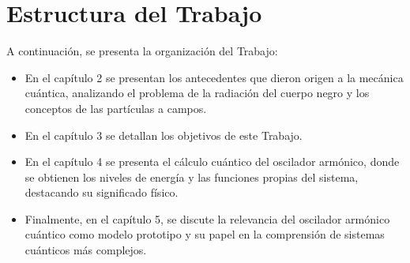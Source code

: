 
\section{Estructura del Trabajo}
	


A continuación, se presenta la organización del Trabajo:

\begin{itemize}
    \item En el capítulo 2 se presentan los antecedentes que dieron origen a la mecánica cuántica, analizando el problema de la radiación del cuerpo negro y los conceptos de las partículas a campos.
    \item En el capítulo 3 se detallan los objetivos de este Trabajo.
    \item En el capítulo 4 se presenta el cálculo cuántico del oscilador armónico, donde se obtienen los niveles de energía y las funciones propias del sistema, destacando su significado físico.
    \item Finalmente, en el capítulo 5, se discute la relevancia del oscilador armónico cuántico como modelo prototipo y su papel en la comprensión de sistemas cuánticos más complejos.
\end{itemize}


